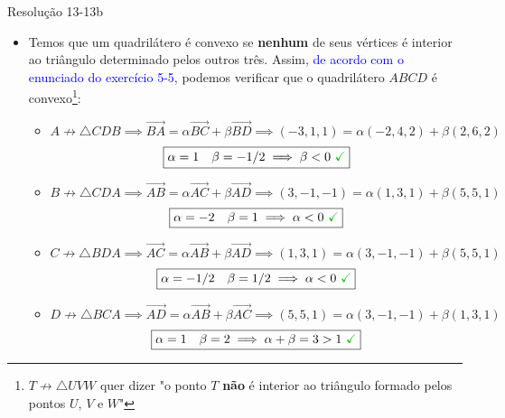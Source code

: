\begin{frame}{Resolução 13-13b}
    \begin{itemize}
        \item Temos que um quadrilátero é convexo se \textbf{nenhum} de seus vértices
            é interior ao triângulo determinado pelos outros três. Assim, \textcolor{blue}{de acordo com o enunciado do exercício 5-5},
            podemos verificar que o quadrilátero \(ABCD\) é convexo\footnote{\(T \not\to \triangle UVW\) quer dizer 
                "o ponto \(T\) \textbf{não} é interior ao triângulo formado pelos pontos \(U\), \(V\) e \(W\)"}:
            \begin{itemize}
                \item \(
                    A \not\to \triangle CDB
                    \implies \vec{BA}=\alpha \vec{BC}+\beta \vec{BD}
                    \implies (-3,1,1)=\alpha (-2,4,2) + \beta (2,6,2)
                    \)
                    \[ \boxed{\alpha = 1 \quad \beta =-1/2  \implies \beta < 0 ~ \color{green!75!black}\checkmark} \]
                \item \(
                    B \not\to \triangle CDA
                    \implies \vec{AB}=\alpha \vec{AC}+\beta \vec{AD}
                    \implies (3,-1,-1)=\alpha (1,3,1) + \beta (5,5,1)
                    \)
                    \[ \boxed{\alpha = -2 \quad \beta =1 \implies \alpha < 0 ~ \color{green!75!black}\checkmark} \]
                \item \(
                    C \not\to \triangle BDA
                    \implies \vec{AC}=\alpha \vec{AB}+\beta \vec{AD}
                    \implies (1,3,1)=\alpha (3,-1,-1) + \beta (5,5,1)
                    \)
                    \[ \boxed{\alpha = -1/2 \quad \beta =1/2 \implies \alpha < 0 ~ \color{green!75!black}\checkmark} \]
                \item \(
                    D \not\to \triangle BCA
                    \implies \vec{AD}=\alpha \vec{AB}+\beta \vec{AC}
                    \implies (5,5,1)=\alpha (3,-1,-1) + \beta (1,3,1)
                    \)
                    \[ \boxed{\alpha = 1 \quad \beta =2 \implies \alpha + \beta = 3 > 1 ~ \color{green!75!black}\checkmark } \]
            \end{itemize}
    \end{itemize}
\end{frame}


